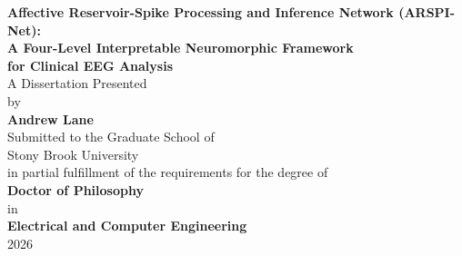 \documentclass[12pt]{report}
\begin{document}
\begin{titlepage}
\centering
\vspace*{2cm}
{\Large \textbf{Affective Reservoir-Spike Processing and Inference Network (ARSPI-Net):}}\\[0.5cm]
{\Large \textbf{A Four-Level Interpretable Neuromorphic Framework}}\\[0.3cm]
{\Large \textbf{for Clinical EEG Analysis}}\\[3cm]
{\large A Dissertation Presented}\\[0.3cm]
{\large by}\\[0.5cm]
{\Large \textbf{Andrew Lane}}\\[3cm]
{\large Submitted to the Graduate School of}\\[0.3cm]
{\large Stony Brook University}\\[0.3cm]
{\large in partial fulfillment of the requirements for the degree of}\\[0.5cm]
{\Large \textbf{Doctor of Philosophy}}\\[0.5cm]
{\large in}\\[0.3cm]
{\Large \textbf{Electrical and Computer Engineering}}\\[2cm]
{\large 2026}
\end{titlepage}
\end{document}
